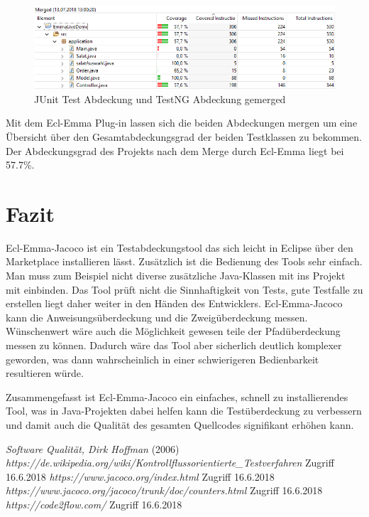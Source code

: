 \documentclass[a4paper]{article}
\begin{document}
\begin{figure}[h]
\includegraphics[scale=0.6]{Merged_Abdeckung.png}
\caption{JUnit Test Abdeckung und TestNG Abdeckung gemerged}
\centering
\end{figure}
Mit dem Ecl-Emma Plug-in lassen sich die beiden Abdeckungen mergen um eine Übersicht über den Gesamtabdeckungsgrad der beiden Testklassen zu bekommen. Der Abdeckungsgrad des Projekts nach dem Merge durch Ecl-Emma liegt bei 57.7\%. 
\newpage
\section{Fazit}
Ecl-Emma-Jacoco ist ein Testabdeckungstool das sich leicht in Eclipse über den Marketplace installieren lässt. Zusätzlich ist die Bedienung des Tools sehr einfach.
Man muss zum Beispiel nicht diverse zusätzliche Java-Klassen mit ins Projekt mit einbinden. Das Tool prüft nicht die Sinnhaftigkeit von Tests, gute Testfalle zu erstellen liegt daher weiter in den Händen des Entwicklers.
Ecl-Emma-Jacoco kann die Anweisungsüberdeckung und die Zweigüberdeckung messen. Wünschenwert wäre auch die Möglichkeit gewesen teile der Pfadüberdeckung messen zu können. Dadurch wäre das Tool aber sicherlich deutlich 
komplexer geworden, was dann wahrscheinlich in einer schwierigeren Bedienbarkeit resultieren würde. 
\par
Zusammengefasst ist Ecl-Emma-Jacoco ein einfaches, schnell zu installierendes Tool, was in Java-Projekten dabei helfen kann die Testüberdeckung zu verbessern und damit auch die Qualität des gesamten Quellcodes signifikant erhöhen kann.
\begin{thebibliography}{1}
	 \emph{Software Qualität, Dirk Hoffman} (2006)
	 \emph{https://de.wikipedia.org/wiki/Kontrollflussorientierte\_Testverfahren} Zugriff 16.6.2018
	 \emph{https://www.jacoco.org/index.html} Zugriff 16.6.2018
	 \emph{https://www.jacoco.org/jacoco/trunk/doc/counters.html} Zugriff 16.6.2018
	 \emph{https://code2flow.com/} Zugriff 16.6.2018
\end{thebibliography}
\end{document}
